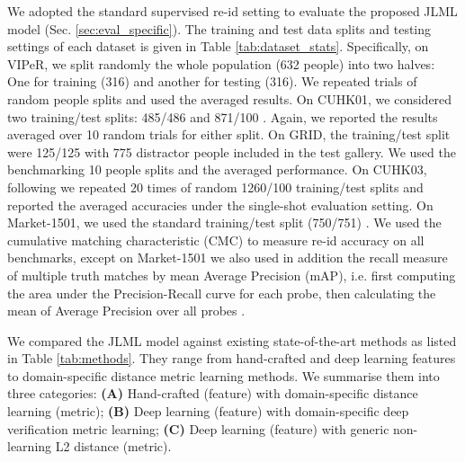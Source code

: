 \documentclass{article}
\begin{document}
\vspace{0.1cm}
We adopted the standard supervised re-id setting to evaluate the proposed JLML model
(Sec. \ref{sec:eval_specific}).
The training and test data splits and testing settings of each dataset is given in Table \ref{tab:dataset_stats}.
Specifically, on VIPeR, we split randomly the whole population (632 people) into two halves: One for training (316) and another for testing (316). 
We repeated  trials of random people splits and used the averaged results.
On CUHK01, we considered two training/test splits:  
485/486 \cite{liao2015person}
and 871/100 \cite{ahmed2015improved}.
Again, we reported the results averaged over 10 random trials for either split.
On GRID, the training/test split were 125/125 with 775 distractor people included in the test gallery.
We used the benchmarking 10 people splits \cite{loy2009multi} and the averaged performance.
On CUHK03, following \cite{li2014deepreid} we repeated 20 times of
random 1260/100 training/test splits and reported the averaged
accuracies under the single-shot evaluation setting. 
On Market-1501, we used the standard training/test split (750/751) \cite{zheng2015scalable}.
We used the cumulative matching characteristic (CMC) to measure
re-id accuracy on all benchmarks, except on Market-1501 we also used
in addition the recall measure of multiple truth matches by mean
Average Precision (mAP), i.e. first computing the area under the
Precision-Recall curve for each probe, then calculating the mean of
Average Precision over all probes \cite{zheng2015scalable}. 



\vspace{0.1cm}
We compared the JLML model against  existing
state-of-the-art methods as listed in Table \ref{tab:methods}.
They range from hand-crafted and deep learning features to
domain-specific distance metric learning methods. 
We summarise them into three categories:
{\bf (A)} Hand-crafted (feature) with domain-specific distance learning (metric);
{\bf (B)} Deep learning (feature) with domain-specific deep verification metric learning;
{\bf (C)} Deep learning (feature) with generic non-learning L2 distance (metric).
\end{document}
